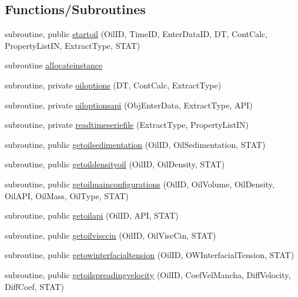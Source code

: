 \subsection*{Functions/\+Subroutines}
\begin{DoxyCompactItemize}
\item 
subroutine, public \mbox{\hyperlink{namespacemoduleoil__0d_a7a8a1d1d956230a40fa8f10e664138e3}{startoil}} (Oil\+ID, Time\+ID, Enter\+Data\+ID, DT, Cont\+Calc, Property\+List\+IN, Extract\+Type, S\+T\+AT)
\item 
subroutine \mbox{\hyperlink{namespacemoduleoil__0d_a90135088740373e7de26e5316c979963}{allocateinstance}}
\item 
subroutine, private \mbox{\hyperlink{namespacemoduleoil__0d_ae91c560ecac70b4b9f3ba4ca7f14edbe}{oiloptions}} (DT, Cont\+Calc, Extract\+Type)
\item 
subroutine, private \mbox{\hyperlink{namespacemoduleoil__0d_aee1786140ad8f5a32f57df0b719d830b}{oiloptionsapi}} (Obj\+Enter\+Data, Extract\+Type, A\+PI)
\item 
subroutine, private \mbox{\hyperlink{namespacemoduleoil__0d_a3c2fbab1e96896178c05bcf889f853fc}{readtimeseriefile}} (Extract\+Type, Property\+List\+IN)
\item 
subroutine, public \mbox{\hyperlink{namespacemoduleoil__0d_a76e417f6fa89172bc195c9dca9d10dc7}{getoilsedimentation}} (Oil\+ID, Oil\+Sedimentation, S\+T\+AT)
\item 
subroutine, public \mbox{\hyperlink{namespacemoduleoil__0d_ab2e737cc90063238a3eedf443bd6b593}{getoildensityoil}} (Oil\+ID, Oil\+Density, S\+T\+AT)
\item 
subroutine, public \mbox{\hyperlink{namespacemoduleoil__0d_af1cdc5385033828e9fd0e86082d2c7f3}{getoilmainconfigurations}} (Oil\+ID, Oil\+Volume, Oil\+Density, Oil\+A\+PI, Oil\+Mass, Oil\+Type, S\+T\+AT)
\item 
subroutine, public \mbox{\hyperlink{namespacemoduleoil__0d_a69465813f24b303b64f2b23399c114da}{getoilapi}} (Oil\+ID, A\+PI, S\+T\+AT)
\item 
subroutine, public \mbox{\hyperlink{namespacemoduleoil__0d_a6049ae3704910b8c95b19beb79419be6}{getoilvisccin}} (Oil\+ID, Oil\+Visc\+Cin, S\+T\+AT)
\item 
subroutine, public \mbox{\hyperlink{namespacemoduleoil__0d_a07a5b422ec6e58c220beb82777c68f30}{getowinterfacialtension}} (Oil\+ID, O\+W\+Interfacial\+Tension, S\+T\+AT)
\item 
subroutine, public \mbox{\hyperlink{namespacemoduleoil__0d_a2eecd31ffeaa8edcf98841c8c93d7fb2}{getoilspreadingvelocity}} (Oil\+ID, Coef\+Vel\+Mancha, Diff\+Velocity, Diff\+Coef, S\+T\+AT)

\end{DoxyCompactItemize}
